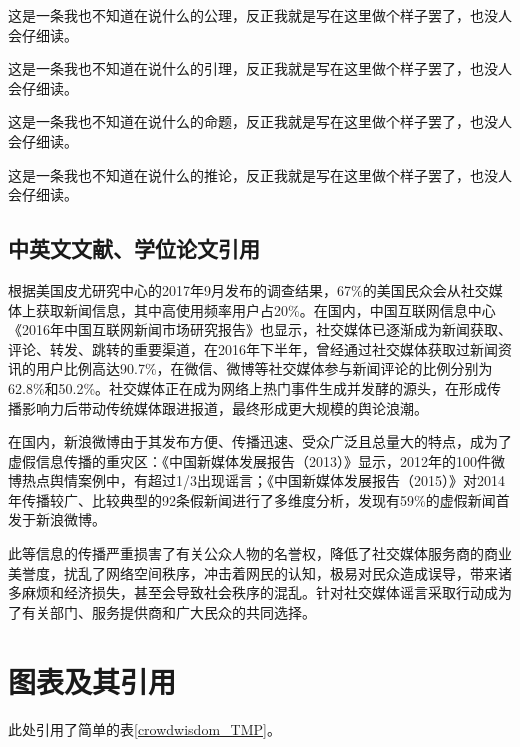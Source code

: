 \documentclass[a4paper,AutoFakeBold,oneside,12pt]{book}
\begin{document}
\begin{axiom}
这是一条我也不知道在说什么的公理，反正我就是写在这里做个样子罢了，也没人会仔细读。
\end{axiom}

\begin{lemma}
这是一条我也不知道在说什么的引理，反正我就是写在这里做个样子罢了，也没人会仔细读。
\end{lemma}

\begin{proposition}
这是一条我也不知道在说什么的命题，反正我就是写在这里做个样子罢了，也没人会仔细读。
\end{proposition}

\begin{corollary}
这是一条我也不知道在说什么的推论，反正我就是写在这里做个样子罢了，也没人会仔细读。
\end{corollary}

\subsection{中英文文献、学位论文引用}
根据美国皮尤研究中心的2017年9月发布的调查结果\cite{pew_news_use_2017}，67\%的美国民众会从社交媒体上获取新闻信息，其中高使用频率用户占20\%。在国内，中国互联网信息中心《2016年中国互联网新闻市场研究报告》\cite{internet_news_2016}也显示，社交媒体已逐渐成为新闻获取、评论、转发、跳转的重要渠道，在2016年下半年，曾经通过社交媒体获取过新闻资讯的用户比例高达90.7\%，在微信、微博等社交媒体参与新闻评论的比例分别为62.8\%和50.2\%。社交媒体正在成为网络上热门事件生成并发酵的源头，在形成传播影响力后带动传统媒体跟进报道，最终形成更大规模的舆论浪潮。\cite{Yang2012Automatic}

在国内，新浪微博由于其发布方便、传播迅速、受众广泛且总量大的特点，成为了虚假信息传播的重灾区：《中国新媒体发展报告（2013）》\cite{唐绪军2013中国新媒体发展报告}显示，2012年的100件微博热点舆情案例中，有超过1/3出现谣言；《中国新媒体发展报告（2015）》\cite{唐绪军2015中国新媒体发展报告}对2014年传播较广、比较典型的92条假新闻进行了多维度分析，发现有59\%的虚假新闻首发于新浪微博。

此等信息的传播严重损害了有关公众人物的名誉权，降低了社交媒体服务商的商业美誉度，扰乱了网络空间秩序，冲击着网民的认知，极易对民众造成误导，带来诸多麻烦和经济损失，甚至会导致社会秩序的混乱。针对社交媒体谣言采取行动成为了有关部门、服务提供商和广大民众的共同选择。\cite{周兴2017基于深度学习的谣言检测及模式挖掘}

\section{图表及其引用}
此处引用了简单的表\ref{crowdwisdom_TMP}。
\end{document}

